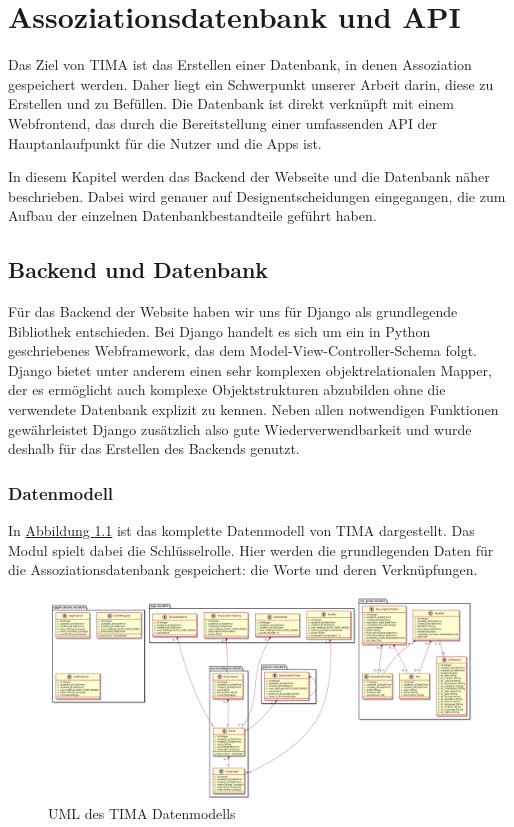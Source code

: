 \chapter{Assoziationsdatenbank und API}
Das Ziel von TIMA ist das Erstellen einer Datenbank, in denen Assoziation gespeichert werden. Daher liegt ein Schwerpunkt unserer Arbeit darin, diese zu Erstellen und zu Befüllen. Die Datenbank ist direkt verknüpft mit einem Webfrontend, das durch die Bereitstellung einer umfassenden API der Hauptanlaufpunkt für die Nutzer und die Apps ist.

In diesem Kapitel werden das Backend der Webseite und die Datenbank näher beschrieben. Dabei wird genauer auf Designentscheidungen eingegangen, die zum Aufbau der einzelnen Datenbankbestandteile geführt haben.

\section{Backend und Datenbank}
Für das Backend der Website haben wir uns für Django als grundlegende Bibliothek entschieden. Bei Django handelt es sich um ein in Python geschriebenes Webframework, das dem Model-View-Controller-Schema folgt. Django bietet unter anderem einen sehr komplexen objektrelationalen Mapper, der es ermöglicht auch komplexe Objektstrukturen abzubilden ohne die verwendete Datenbank explizit zu kennen. Neben allen notwendigen Funktionen gewährleistet Django zusätzlich also gute Wiederverwendbarkeit und wurde deshalb für das Erstellen des Backends genutzt.

\subsection{Datenmodell}
In \hyperref[fig:uml]{Abbildung \ref*{fig:uml}} ist das komplette Datenmodell von TIMA dargestellt. Das Modul  spielt dabei die Schlüsselrolle. Hier werden die grundlegenden Daten für die Assoziationsdatenbank gespeichert: die Worte und deren Verknüpfungen.

\begin{figure}
	\centering
	\includegraphics[width=\textwidth]{images/uml.png}
	\caption{UML des TIMA Datenmodells}
	\label{fig:uml}
\end{figure}

